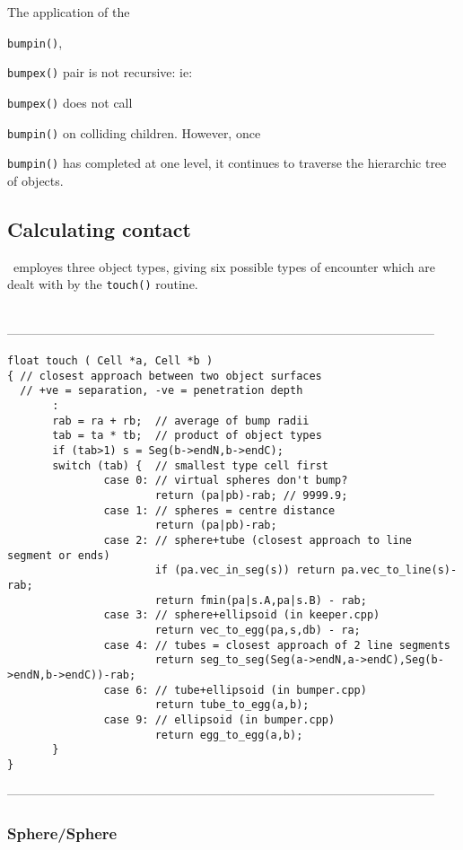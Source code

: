 The application of the {{\tt bumpin()}, {{\tt bumpex()} pair is not recursive: ie:
{{\tt bumpex()} does not call {{\tt bumpin()} on colliding children.  However, once
{{\tt bumpin()} has completed at one level, it continues to traverse the hierarchic
tree of objects.

\subsection{Calculating contact}

\NAME\ employes three object types, giving six possible types of encounter
which are dealt with by the {\tt touch()} routine.
\begin{singlespace}
\ \\
------------------------------------------------------------------------------------------------------
\begin{tiny}
\begin{verbatim}
float touch ( Cell *a, Cell *b )
{ // closest approach between two object surfaces
  // +ve = separation, -ve = penetration depth
       :
       rab = ra + rb;  // average of bump radii
       tab = ta * tb;  // product of object types
       if (tab>1) s = Seg(b->endN,b->endC);
       switch (tab) {  // smallest type cell first
               case 0: // virtual spheres don't bump?
                       return (pa|pb)-rab; // 9999.9;
               case 1: // spheres = centre distance
                       return (pa|pb)-rab;
               case 2: // sphere+tube (closest approach to line segment or ends)
                       if (pa.vec_in_seg(s)) return pa.vec_to_line(s)-rab;
                       return fmin(pa|s.A,pa|s.B) - rab;
               case 3: // sphere+ellipsoid (in keeper.cpp)
                       return vec_to_egg(pa,s,db) - ra;
               case 4: // tubes = closest approach of 2 line segments
                       return seg_to_seg(Seg(a->endN,a->endC),Seg(b->endN,b->endC))-rab;
               case 6: // tube+ellipsoid (in bumper.cpp)
                       return tube_to_egg(a,b);
               case 9: // ellipsoid (in bumper.cpp)
                       return egg_to_egg(a,b);
       }
}
\end{verbatim}
\end{tiny}
------------------------------------------------------------------------------------------------------
\end{singlespace}

\subsubsection{Sphere/Sphere}

}}}}}

